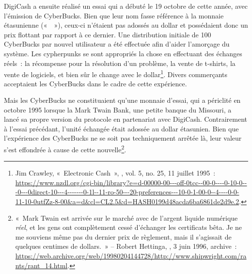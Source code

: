 DigiCash a ensuite réalisé un essai qui a débuté le 19 octobre de cette année, avec l'émission de CyberBucks. Bien que leur nom fasse référence à la monnaie étasunienne («~~»), ceux-ci n'étaient pas adossés au dollar et possédaient donc un prix flottant par rapport à ce dernier. Une distribution initiale de 100 CyberBucks par nouvel utilisateur a été effectuée afin d'aider l'amorçage du système. Les cypherpunks se sont appropriés la chose en effectuant des échanges réels~: la récompense pour la résolution d'un problème, la vente de t-shirts, la vente de logiciels, et bien sûr le change avec le dollar\footnote{Jim Crawley, «~Electronic Cash~», , vol. 5, no. 25, 11 juillet 1995~: \url{https://www.nzdl.org/cgi-bin/library?e=d-00000-00---off-0tcc--00-0----0-10-0---0---0direct-10---4-------0-1l--11-ro-50---20-preferences---10-0-1-00-0--4----0-0-11-10-0utfZz-8-00&a=d&cl=CL2.5&d=HASH0199d48acda6ba6861de2d9e.2}.}. Divers commerçants acceptaient les CyberBucks dans le cadre de cette expérience.

Mais les CyberBucks ne constituaient qu'une monnaie d'essai, qui a périclité en octobre 1995 lorsque la Mark Twain Bank, une petite banque du Missouri, a lancé sa propre version du protocole en partenariat avec DigiCash. Contrairement à l'essai précédant, l'unité échangée était adossée au dollar étasunien. Bien que l'expérience des CyberBucks ne se soit pas techniquement arrêtée là, leur valeur s'est effondrée à cause de cette nouvelle\footnote{«~Mark Twain est arrivée sur le marché avec de l'argent liquide numérique \emph{réel}, et les gens ont complètement cessé d'échanger les certificats bêta. Je ne me souviens même pas du dernier prix de règlement, mais il s'agissait de quelques centimes de dollars.~» -- Robert Hettinga, , 3 juin 1996, archive~: \url{https://web.archive.org/web/19980204144728/http://www.shipwright.com/rants/rant_14.html}.}. %

